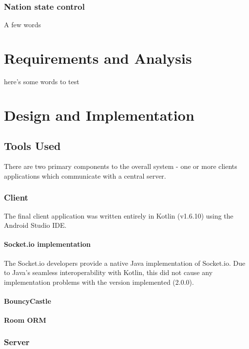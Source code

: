 \documentclass{mproj}
\begin{document}
\subsection{Nation state control}
A few words

\chapter{Requirements and Analysis}\label{analysis}
here's some words to test

\chapter{Design and Implementation}\label{design}

\section{Tools Used}
There are two primary components to the overall system - one or more clients applications which communicate with a central server.

\subsection{Client}
The final client application was written entirely in Kotlin (v1.6.10) using the Android Studio IDE.

\subsubsection{Socket.io implementation}
The Socket.io developers provide a native Java implementation of Socket.io. Due to Java's seamless interoperability with Kotlin, this did not cause any implementation problems with the version implemented (2.0.0).

\subsubsection{BouncyCastle}


\subsubsection{Room ORM}

\subsubsection{}


\subsection{Server}
\end{document}

